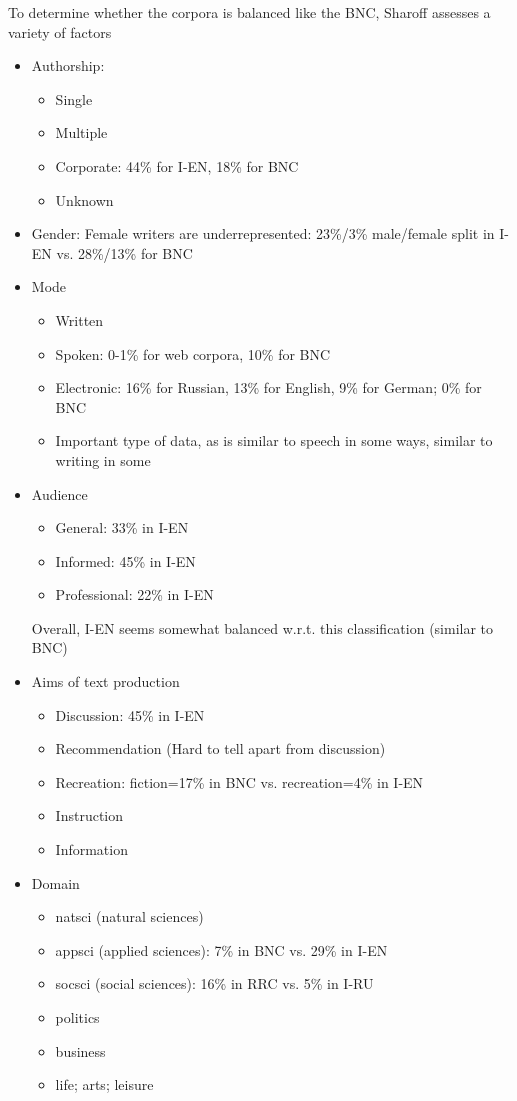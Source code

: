 \documentclass[a4paper,landscape,headrule,footrule,xetex]{foils}
\begin{document}
To determine whether the corpora is balanced like the BNC,
Sharoff assesses a variety of factors
\begin{itemize}
\item Authorship:
  \begin{itemize}
  \item Single
  \item Multiple
  \item Corporate: 44\% for I-EN, 18\% for BNC
  \item Unknown
  \end{itemize}
\item Gender: Female writers are underrepresented: 23\%/3\%
  male/female split in I-EN vs. 28\%/13\% for BNC
\newpage
\item Mode
  \begin{itemize}
  \item Written
  \item Spoken: 0-1\% for web corpora, 10\% for BNC
  \item Electronic: 16\% for Russian, 13\% for English, 9\% for
German; 0\% for BNC
\item Important type of data, as is similar to speech in some
ways, similar to writing in some
\end{itemize}
\item Audience
  \begin{itemize}
  \item General: 33\% in I-EN
  \item Informed: 45\% in I-EN
  \item Professional: 22\% in I-EN
  \end{itemize}
  Overall, I-EN seems somewhat balanced w.r.t. this
  classification (similar to BNC)
\item Aims of text production
  \begin{itemize}
  \item Discussion: 45\% in I-EN
  \item Recommendation (Hard to tell apart from discussion)
  \item Recreation: fiction=17\% in BNC vs. recreation=4\% in I-EN
  \item Instruction
  \item Information
  \end{itemize}
\item Domain
  \begin{itemize}
  \item natsci (natural sciences)
  \item appsci (applied sciences): 7\% in BNC vs. 29\% in I-EN
  \item socsci (social sciences): 16\% in RRC vs. 5\% in I-RU
  \item politics
  \item business
  \item life;  arts;  leisure
  \end{itemize}
\end{itemize}
\end{document}
